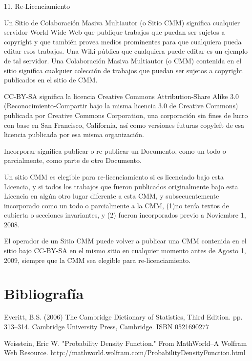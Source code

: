 \documentclass[a4paper, 11pt, oneside]{report}
\begin{document}
11. Re-Licenciamiento

Un Sitio de Colaboración Masiva Multiautor (o Sitio CMM) significa cualquier servidor World Wide Web que publique trabajos que puedan ser sujetos a copyright y que también provea medios prominentes para que cualquiera pueda editar esos trabajos. Una Wiki pública que cualquiera puede editar es un ejemplo de tal servidor. Una Colaboración Masiva Multiautor (o CMM) contenida en el sitio significa cualquier colección de trabajos que puedan ser sujetos a copyright publicados en el sitio de CMM.

CC-BY-SA significa la licencia Creative Commons Attribution-Share Alike 3.0 (Reconocimiento-Compartir bajo la misma licencia 3.0 de Creative Commons) publicada por Creative Commons Corporation, una corporación sin fines de lucro con base en San Francisco, California, así como versiones futuras copyleft de esa licencia publicada por esa misma organización.

Incorporar significa publicar o re-publicar un Documento, como un todo o parcialmente, como parte de otro Documento.

Un sitio CMM es elegible para re-licenciamiento si es licenciado bajo esta Licencia, y si todos los trabajos que fueron publicados originalmente bajo esta Licencia en algún otro lugar diferente a esta CMM, y subsecuentemente incorporado como un todo o parcialmente a la CMM, (1)no tenía textos de cubierta o secciones invariantes, y (2) fueron incorporados previo a Noviembre 1, 2008.

El operador de un Sitio CMM puede volver a publicar una CMM contenida en el sitio bajo CC-BY-SA en el mismo sitio en cualquier momento antes de Agosto 1, 2009, siempre que la CMM sea elegible para re-licenciamiento.

\chapter{Bibliografía}

Everitt, B.S. (2006) The Cambridge Dictionary of Statistics, Third Edition. pp. 313–314. Cambridge University Press, Cambridge. ISBN 0521690277

Weisstein, Eric W. "Probability Density Function." From MathWorld--A Wolfram Web Resource. http://mathworld.wolfram.com/ProbabilityDensityFunction.html
\end{document}
